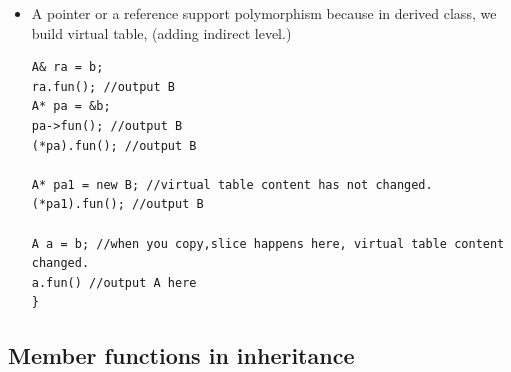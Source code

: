 \documentclass[a4paper,11pt,twoside]{book}
\begin{document}
\begin{itemize}
\item A pointer or a reference support polymorphism because in derived class, we build virtual table, (adding indirect level.)
\begin{lstlisting}
A& ra = b;
ra.fun(); //output B
A* pa = &b;
pa->fun(); //output B
(*pa).fun(); //output B
		
A* pa1 = new B; //virtual table content has not changed.
(*pa1).fun(); //output B

A a = b; //when you copy,slice happens here, virtual table content changed. 
a.fun() //output A here
}
\end{lstlisting}

\end{itemize}

\subsection{Member functions in inheritance}
\end{document}
